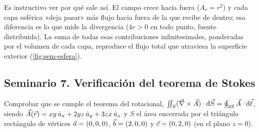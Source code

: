 \begin{observacion}
Es instructivo ver por qué sale así. El campo crece hacia fuera ($A_r=r^{2}$) y
cada capa esférica «deja pasar» más flujo hacia fuera de la que recibe de
dentro; esa diferencia es lo que mide la divergencia ($4r>0$ en todo punto,
fuente distribuida). La suma de todas esas contribuciones infinitesimales,
ponderadas por el volumen de cada capa, reproduce el flujo total que atraviesa
la superficie exterior (\cref{fig:sem-esfera}).
\end{observacion}



\subsection{Seminario 7. Verificación del teorema de Stokes}\label{sem:stokes}
\begin{ejercicio}\label{ejer:stokes-triangulo}
Comprobar que se cumple el teorema del rotacional,
$\iint_S(\vec{\nabla}\times\vec{A})\cdot\mathrm{d}\vec{S}=\oint_{\partial S}\vec{A}\cdot\mathrm{d}\vec{\ell}$, siendo
$\vec{A}(\vec{r})=xy\,\hat{u}_{x}+2yz\,\hat{u}_{y}+3zx\,\hat{u}_{z}$ y $S$ el área encerrada por el triángulo
rectángulo de vértices $\vec{a}=(0,0,0)$, $\vec{b}=(2,0,0)$ y $\vec{c}=(0,2,0)$ (en el
plano $z=0$).
\end{ejercicio}
